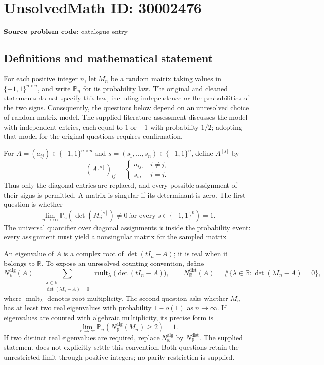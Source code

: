 \documentclass[11pt]{article}
\newcommand{\R}{\mathbb{R}}
\begin{document}
\section*{UnsolvedMath ID: 30002476}
\textbf{Source problem code:} catalogue entry
\subsection{Definitions and mathematical statement}
For each positive integer \(n\), let \(M_n\) be a random matrix taking values in \(\{-1,1\}^{n\times n}\), and write \(\mathbb P_n\) for its probability law. The original and cleaned statements do not specify this law, including independence or the probabilities of the two signs. Consequently, the questions below depend on an unresolved choice of random-matrix model. The supplied literature assessment discusses the model with independent entries, each equal to \(1\) or \(-1\) with probability \(1/2\); adopting that model for the original questions requires confirmation.

For \(A=(a_{ij})\in\{-1,1\}^{n\times n}\) and \(s=(s_1,\ldots,s_n)\in\{-1,1\}^n\), define \(A^{[s]}\) by
\[
(A^{[s]})_{ij}=\begin{cases}a_{ij},&i\ne j,\\s_i,&i=j.\end{cases}
\]
Thus only the diagonal entries are replaced, and every possible assignment of their signs is permitted. A matrix is singular if its determinant is zero. The first question is whether
\[
\lim_{n\to\infty}\mathbb P_n\!\left(\det(M_n^{[s]})\ne0\ \text{for every }s\in\{-1,1\}^n\right)=1.
\]
The universal quantifier over diagonal assignments is inside the probability event: every assignment must yield a nonsingular matrix for the sampled matrix.

An eigenvalue of \(A\) is a complex root of \(\det(tI_n-A)\); it is real when it belongs to \(\R\). To expose an unresolved counting convention, define
\[
N_{\R}^{\mathrm{alg}}(A)=\sum_{\substack{\lambda\in\R\\\det(\lambda I_n-A)=0}}\operatorname{mult}_{\lambda}\bigl(\det(tI_n-A)\bigr),
\qquad
N_{\R}^{\mathrm{dist}}(A)=\#\{\lambda\in\R:\det(\lambda I_n-A)=0\},
\]
where \(\operatorname{mult}_{\lambda}\) denotes root multiplicity. The second question asks whether \(M_n\) has at least two real eigenvalues with probability \(1-o(1)\) as \(n\to\infty\). If eigenvalues are counted with algebraic multiplicity, its precise form is
\[
\lim_{n\to\infty}\mathbb P_n\!\left(N_{\R}^{\mathrm{alg}}(M_n)\ge2\right)=1.
\]
If two distinct real eigenvalues are required, replace \(N_{\R}^{\mathrm{alg}}\) by \(N_{\R}^{\mathrm{dist}}\). The supplied statement does not explicitly settle this convention. Both questions retain the unrestricted limit through positive integers; no parity restriction is supplied.
\end{document}
